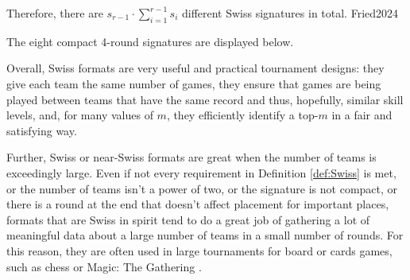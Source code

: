 {{        Therefore, there are $s_{r-1} \cdot \sum_{i=1}^{r-1}s_i$ different Swiss signatures in total.
    }{}{Fried}{2024}

    The eight compact 4-round signatures are displayed below.

    
    Overall, Swiss formats are very useful and practical tournament designs: they give each team the same number of games, they ensure that games are being played between teams that have the same record and thus, hopefully, similar skill levels, and, for many values of $m$, they efficiently identify a top-$m$ in a fair and satisfying way.

    Further, Swiss or near-Swiss formats are great when the number of teams is exceedingly large. Even if not every requirement in Definition \ref{def:Swiss} is met, or the number of teams isn't a power of two, or the signature is not compact, or there is a round at the end that doesn't affect placement for important places, formats that are Swiss in spirit tend to do a great job of gathering a lot of meaningful data about a large number of teams in a small number of rounds. For this reason, they are often used in large tournaments for board or cards games, such as chess or Magic: The Gathering \cite{ifno_mtg}.
}